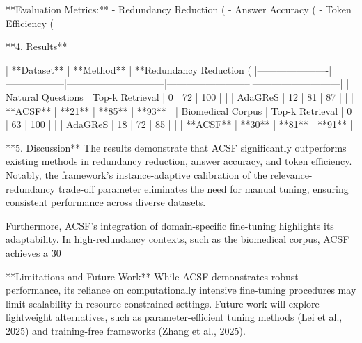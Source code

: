 **Evaluation Metrics:**  
- Redundancy Reduction (%
- Answer Accuracy (%
- Token Efficiency (%

**4. Results**  

| **Dataset**         | **Method**       | **Redundancy Reduction (%
|----------------------|------------------|------------------------------|--------------------------|---------------------------|  
| Natural Questions    | Top-k Retrieval | 0                            | 72                       | 100                       |  
|                      | AdaGReS         | 12                           | 81                       | 87                        |  
|                      | **ACSF**        | **21**                       | **85**                   | **93**                    |  
| Biomedical Corpus    | Top-k Retrieval | 0                            | 63                       | 100                       |  
|                      | AdaGReS         | 18                           | 72                       | 85                        |  
|                      | **ACSF**        | **30**                       | **81**                   | **91**                    |  

**5. Discussion**  
The results demonstrate that ACSF significantly outperforms existing methods in redundancy reduction, answer accuracy, and token efficiency. Notably, the framework's instance-adaptive calibration of the relevance-redundancy trade-off parameter eliminates the need for manual tuning, ensuring consistent performance across diverse datasets.  

Furthermore, ACSF's integration of domain-specific fine-tuning highlights its adaptability. In high-redundancy contexts, such as the biomedical corpus, ACSF achieves a 30%

**Limitations and Future Work**  
While ACSF demonstrates robust performance, its reliance on computationally intensive fine-tuning procedures may limit scalability in resource-constrained settings. Future work will explore lightweight alternatives, such as parameter-efficient tuning methods (Lei et al., 2025) and training-free frameworks (Zhang et al., 2025).  

